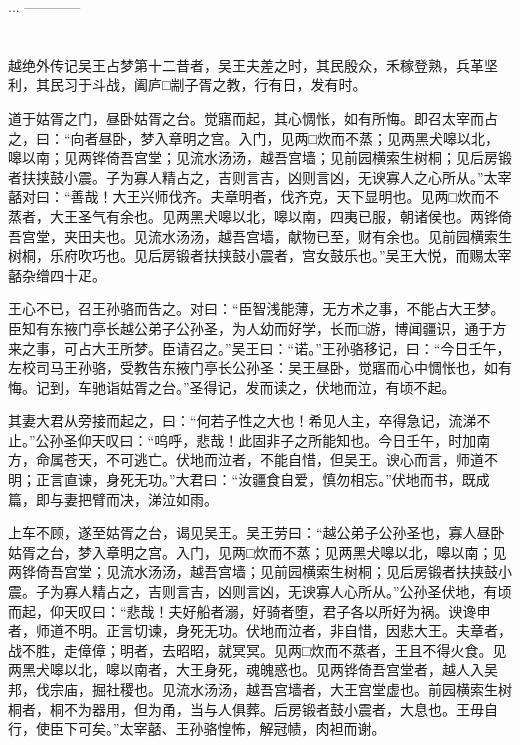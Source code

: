 \documentclass[12pt,UTF8]{ctexbook}
\begin{document}
...
------------

\part{}

越绝外传记吴王占梦第十二昔者，吴王夫差之时，其民殷众，禾稼登熟，兵革坚利，其民习于斗战，阖庐□剬子胥之教，行有日，发有时。

道于姑胥之门，昼卧姑胥之台。觉寤而起，其心惆怅，如有所悔。即召太宰而占之，曰：“向者昼卧，梦入章明之宫。入门，见两□炊而不蒸；见两黑犬嗥以北，嗥以南；见两铧倚吾宫堂；见流水汤汤，越吾宫墙；见前园横索生树桐；见后房锻者扶挟鼓小震。子为寡人精占之，吉则言吉，凶则言凶，无谀寡人之心所从。”太宰嚭对曰：“善哉！大王兴师伐齐。夫章明者，伐齐克，天下显明也。见两□炊而不蒸者，大王圣气有余也。见两黑犬嗥以北，嗥以南，四夷已服，朝诸侯也。两铧倚吾宫堂，夹田夫也。见流水汤汤，越吾宫墙，献物已至，财有余也。见前园横索生树桐，乐府吹巧也。见后房锻者扶挟鼓小震者，宫女鼓乐也。”吴王大悦，而赐太宰嚭杂缯四十疋。

王心不已，召王孙骆而告之。对曰：“臣智浅能薄，无方术之事，不能占大王梦。臣知有东掖门亭长越公弟子公孙圣，为人幼而好学，长而□游，博闻疆识，通于方来之事，可占大王所梦。臣请召之。”吴王曰：“诺。”王孙骆移记，曰：“今日壬午，左校司马王孙骆，受教告东掖门亭长公孙圣：吴王昼卧，觉寤而心中惆怅也，如有悔。记到，车驰诣姑胥之台。”圣得记，发而读之，伏地而泣，有顷不起。

其妻大君从旁接而起之，曰：“何若子性之大也！希见人主，卒得急记，流涕不止。”公孙圣仰天叹曰：“呜呼，悲哉！此固非子之所能知也。今日壬午，时加南方，命属苍天，不可逃亡。伏地而泣者，不能自惜，但吴王。谀心而言，师道不明；正言直谏，身死无功。”大君曰：“汝疆食自爱，慎勿相忘。”伏地而书，既成篇，即与妻把臂而决，涕泣如雨。

上车不顾，遂至姑胥之台，谒见吴王。吴王劳曰：“越公弟子公孙圣也，寡人昼卧姑胥之台，梦入章明之宫。入门，见两□炊而不蒸；见两黑犬嗥以北，嗥以南；见两铧倚吾宫堂；见流水汤汤，越吾宫墙；见前园横索生树桐；见后房锻者扶挟鼓小震。子为寡人精占之，吉则言吉，凶则言凶，无谀寡人心所从。”公孙圣伏地，有顷而起，仰天叹曰：“悲哉！夫好船者溺，好骑者堕，君子各以所好为祸。谀谗申者，师道不明。正言切谏，身死无功。伏地而泣者，非自惜，因悲大王。夫章者，战不胜，走傽傽；明者，去昭昭，就冥冥。见两□炊而不蒸者，王且不得火食。见两黑犬嗥以北，嗥以南者，大王身死，魂魄惑也。见两铧倚吾宫堂者，越人入吴邦，伐宗庙，掘社稷也。见流水汤汤，越吾宫墙者，大王宫堂虚也。前园横索生树桐者，桐不为器用，但为甬，当与人俱葬。后房锻者鼓小震者，大息也。王毋自行，使臣下可矣。”太宰嚭、王孙骆惶怖，解冠帻，肉袒而谢。
\end{document}
